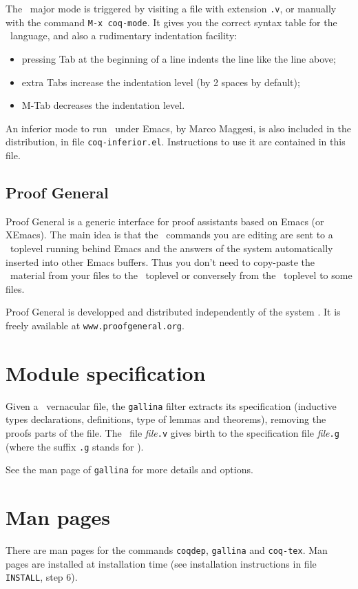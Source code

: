 The \Coq\ major mode is triggered by visiting a file with extension {\tt .v},
or manually with the command \verb!M-x coq-mode!.
It gives you the correct syntax table for
the \Coq\ language, and also a rudimentary indentation facility:
\begin{itemize}
  \item pressing {\sc Tab} at the beginning of a line indents the line like
    the line above;

  \item extra {\sc Tab}s increase the indentation level
    (by 2 spaces by default);

  \item M-{\sc Tab} decreases the indentation level.
\end{itemize}

An inferior mode to run \Coq\ under Emacs, by Marco Maggesi, is also
included in the distribution, in file \texttt{coq-inferior.el}.
Instructions to use it are contained in this file.

\subsection{Proof General}

Proof General is a generic interface for proof assistants based on
Emacs (or XEmacs). The main idea is that the \Coq\ commands you are
editing are sent to a \Coq\ toplevel running behind Emacs and the
answers of the system automatically inserted into other Emacs buffers. 
Thus you don't need to copy-paste the \Coq\ material from your files
to the \Coq\ toplevel or conversely from the \Coq\ toplevel to some
files. 

Proof General is developped and distributed independently of the
system \Coq. It is freely available at \verb!www.proofgeneral.org!.


\section{Module specification}\label{gallina}

Given a \Coq\ vernacular file, the {\tt gallina} filter extracts its
specification (inductive types declarations, definitions, type of
lemmas and theorems), removing the proofs parts of the file. The \Coq\
file {\em file}{\tt.v} gives birth to the specification file
{\em file}{\tt.g} (where the suffix {\tt.g} stands for \gallina).

See the man page of {\tt gallina} for more details and options.


\section{Man pages}\label{ManPages}

There are man pages for the commands {\tt coqdep}, {\tt gallina} and
{\tt coq-tex}. Man pages are installed at installation time
(see installation instructions in file {\tt INSTALL}, step 6).



